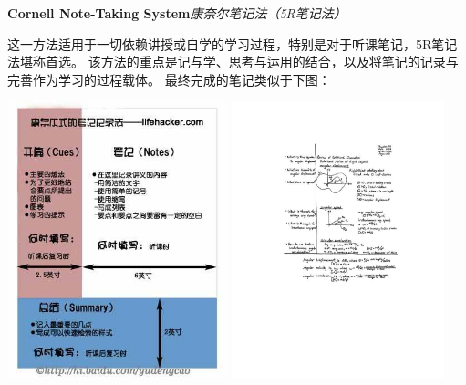 \newpage

\begin{shaded}
	{\bf\Large Cornell Note-Taking System}\hfill{\it 康奈尔笔记法（5R笔记法）}
	
	\bigskip
	
	这一方法适用于一切依赖讲授或自学的学习过程，特别是对于听课笔记，5R笔记法堪称首选。
	该方法的重点是记与学、思考与运用的结合，以及将笔记的记录与完善作为学习的过程载体。
	最终完成的笔记类似于下图：
	
	
	\begin{center}
		\includegraphics[height=8cm]{./images/00/Cornell-NTS/NTS-CH.jpg}\quad
		\includegraphics[height=8cm]{./images/00/Cornell-NTS/exCNTS.pdf}
	\end{center}
	

\end{shaded}
